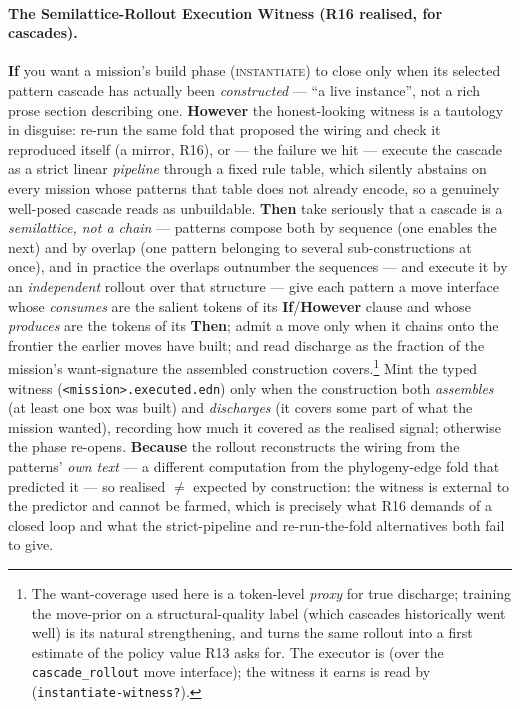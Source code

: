 \paragraph{The Semilattice-Rollout Execution Witness (R16 realised, for cascades).\apparatusmark{}} \textbf{If} you want a mission's build phase (\textsc{instantiate}) to close only when its selected pattern cascade has actually been \emph{constructed} --- ``a live instance'', not a rich prose section describing one. \textbf{However} the honest-looking witness is a tautology in disguise: re-run the same fold that proposed the wiring and check it reproduced itself (a mirror, R16), or --- the failure we hit --- execute the cascade as a strict linear \emph{pipeline} through a fixed rule table, which silently abstains on every mission whose patterns that table does not already encode, so a genuinely well-posed cascade reads as unbuildable. \textbf{Then} take seriously that a cascade is a \emph{semilattice, not a chain} --- patterns compose both by sequence (one enables the next) and by overlap (one pattern belonging to several sub-constructions at once), and in practice the overlaps outnumber the sequences --- and execute it by an \emph{independent} rollout over that structure --- give each pattern a move interface whose \emph{consumes} are the salient tokens of its \textbf{If}/\textbf{However} clause and whose \emph{produces} are the tokens of its \textbf{Then}; admit a move only when it chains onto the frontier the earlier moves have built; and read discharge as the fraction of the mission's want-signature the assembled construction covers.\footnote{The want-coverage used here is a token-level \emph{proxy} for true discharge; training the move-prior on a structural-quality label (which cascades historically went well) is its natural strengthening, and turns the same rollout into a first estimate of the policy value R13 asks for. The executor is  (over the \texttt{cascade\_rollout} move interface); the witness it earns is read by  (\texttt{instantiate-witness?}).} Mint the typed witness (\texttt{<mission>.executed.edn}) only when the construction both \emph{assembles} (at least one box was built) and \emph{discharges} (it covers some part of what the mission wanted), recording how much it covered as the realised signal; otherwise the phase re-opens. \textbf{Because} the rollout reconstructs the wiring from the patterns' \emph{own text} --- a different computation from the phylogeny-edge fold that predicted it --- so realised $\ne$ expected by construction: the witness is external to the predictor and cannot be farmed, which is precisely what R16 demands of a closed loop and what the strict-pipeline and re-run-the-fold alternatives both fail to give.


